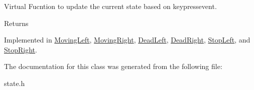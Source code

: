 Virtual Fucntion to update the current state based on keypressevent. 

\begin{DoxyReturn}{Returns}

\end{DoxyReturn}


Implemented in \hyperlink{classMovingLeft_a0ddbc7a065b820e06caa76c650ab6765}{Moving\-Left}, \hyperlink{classMovingRight_aa3ccaf974ea8137e77a26cb3738345c1}{Moving\-Right}, \hyperlink{classDeadLeft_a641116efda392a1c6437e9034443a1ea}{Dead\-Left}, \hyperlink{classDeadRight_a90bbfab63b08a87dd2b36bbdb8830aa5}{Dead\-Right}, \hyperlink{classStopLeft_ae853fc7d82f2a8d306adc186ab9e52dd}{Stop\-Left}, and \hyperlink{classStopRight_a40403908f1cf3ac8ca809c550fea3783}{Stop\-Right}.



The documentation for this class was generated from the following file\-:\begin{DoxyCompactItemize}
\item 
state.\-h\end{DoxyCompactItemize}
